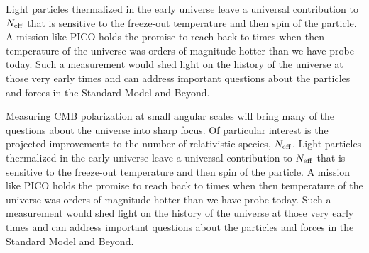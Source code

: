 \documentclass[PICOReport.tex]{subfiles}
\begin{document}
Light particles thermalized in the early universe leave a universal contribution to ${N_{\rm eff}}$ that is sensitive to the freeze-out temperature and then spin of the particle.  A mission like PICO holds the promise to reach back to times when then temperature of the universe was orders of magnitude hotter than we have probe today.  Such a measurement would shed light on the history of the universe at those very early times and can address important questions about the particles and forces in the Standard Model and Beyond.



Measuring CMB polarization at small angular scales will bring many of the questions about the universe into sharp focus.  Of particular interest is the projected improvements to the number of relativistic species, ${N_{\rm eff}}$.  Light particles thermalized in the early universe leave a universal contribution to ${N_{\rm eff}}$ that is sensitive to the freeze-out temperature and then spin of the particle.  A mission like PICO holds the promise to reach back to times when then temperature of the universe was orders of magnitude hotter than we have probe today.  Such a measurement would shed light on the history of the universe at those very early times and can address important questions about the particles and forces in the Standard Model and Beyond. 


\end{document}
